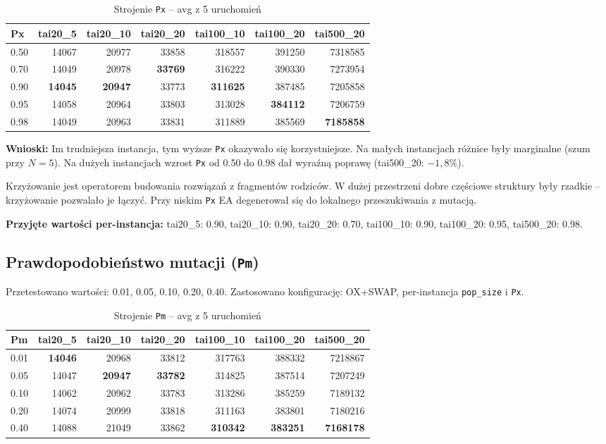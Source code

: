 \documentclass[11pt,a4paper]{article}
\begin{document}
\begin{table}[H]
\centering
\caption{Strojenie \texttt{Px} -- avg z 5 uruchomień}
\begin{tabular}{lrrrrrr}
\toprule
Px & tai20\_5 & tai20\_10 & tai20\_20 & tai100\_10 & tai100\_20 & tai500\_20 \\
\midrule
0.50 & 14067 & 20977 & 33858 & 318557 & 391250 & 7318585 \\
0.70 & 14049 & 20978 & \textbf{33769} & 316222 & 390330 & 7273954 \\
0.90 & \textbf{14045} & \textbf{20947} & 33773 & \textbf{311625} & 387485 & 7205858 \\
0.95 & 14058 & 20964 & 33803 & 313028 & \textbf{384112} & 7206759 \\
0.98 & 14049 & 20963 & 33831 & 311889 & 385569 & \textbf{7185858} \\
\bottomrule
\end{tabular}
\end{table}

\textbf{Wnioski:} Im trudniejsza instancja, tym wyższe \texttt{Px} okazywało się korzystniejsze. Na małych instancjach różnice były marginalne (szum przy $N=5$). Na dużych instancjach wzrost \texttt{Px} od 0.50 do 0.98 dał wyraźną poprawę (tai500\_20: $-1{,}8\%$).

Krzyżowanie jest operatorem budowania rozwiązań z fragmentów rodziców. W dużej przestrzeni dobre częściowe struktury były rzadkie -- krzyżowanie pozwalało je łączyć. Przy niskim \texttt{Px} EA degenerował się do lokalnego przeszukiwania z mutacją.

\textbf{Przyjęte wartości per-instancja:} tai20\_5: 0.90, tai20\_10: 0.90, tai20\_20: 0.70, tai100\_10: 0.90, tai100\_20: 0.95, tai500\_20: 0.98.

\subsection{Prawdopodobieństwo mutacji (\texttt{Pm})}

Przetestowano wartości: 0.01, 0.05, 0.10, 0.20, 0.40. Zastosowano konfigurację: OX+SWAP, per-instancja \texttt{pop\_size} i \texttt{Px}.

\begin{table}[H]
\centering
\caption{Strojenie \texttt{Pm} -- avg z 5 uruchomień}
\begin{tabular}{lrrrrrr}
\toprule
Pm & tai20\_5 & tai20\_10 & tai20\_20 & tai100\_10 & tai100\_20 & tai500\_20 \\
\midrule
0.01 & \textbf{14046} & 20968 & 33812 & 317763 & 388332 & 7218867 \\
0.05 & 14047 & \textbf{20947} & \textbf{33782} & 314825 & 387514 & 7207249 \\
0.10 & 14062 & 20962 & 33783 & 313286 & 385259 & 7189132 \\
0.20 & 14074 & 20999 & 33818 & 311163 & 383801 & 7180216 \\
0.40 & 14088 & 21049 & 33862 & \textbf{310342} & \textbf{383251} & \textbf{7168178} \\
\bottomrule
\end{tabular}
\end{table}
\end{document}
